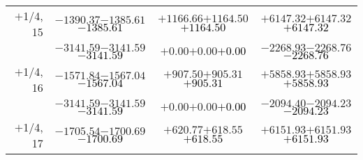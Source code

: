 \documentclass[compress]{beamer}
\begin{document}
\begin{frame}
{\begin{tabular}{r | c | c | c}
$+$1/4, 15 & $-1390.37$\hspace{0.1 cm}$-1385.61$\hspace{0.1 cm}\textcolor{black}{$-1385.61$} & $+1166.66$\hspace{0.1 cm}$+1164.50$\hspace{0.1 cm}\textcolor{black}{$+1164.50$} & $+6147.32$\hspace{0.1 cm}$+6147.32$\hspace{0.1 cm}\textcolor{black}{$+6147.32$} \\
           & $-3141.59$\hspace{0.1 cm}$-3141.59$\hspace{0.1 cm}\textcolor{black}{$-3141.59$} & $+0.00$\hspace{0.1 cm}$+0.00$\hspace{0.1 cm}\textcolor{black}{$+0.00$} & $-2268.93$\hspace{0.1 cm}$-2268.76$\hspace{0.1 cm}\textcolor{black}{$-2268.76$} \\
$+$1/4, 16 & $-1571.84$\hspace{0.1 cm}$-1567.04$\hspace{0.1 cm}\textcolor{black}{$-1567.04$} & $+907.50$\hspace{0.1 cm}$+905.31$\hspace{0.1 cm}\textcolor{black}{$+905.31$} & $+5858.93$\hspace{0.1 cm}$+5858.93$\hspace{0.1 cm}\textcolor{black}{$+5858.93$} \\
           & $-3141.59$\hspace{0.1 cm}$-3141.59$\hspace{0.1 cm}\textcolor{black}{$-3141.59$} & $+0.00$\hspace{0.1 cm}$+0.00$\hspace{0.1 cm}\textcolor{black}{$+0.00$} & $-2094.40$\hspace{0.1 cm}$-2094.23$\hspace{0.1 cm}\textcolor{black}{$-2094.23$} \\
$+$1/4, 17 & $-1705.54$\hspace{0.1 cm}$-1700.69$\hspace{0.1 cm}\textcolor{black}{$-1700.69$} & $+620.77$\hspace{0.1 cm}$+618.55$\hspace{0.1 cm}\textcolor{black}{$+618.55$} & $+6151.93$\hspace{0.1 cm}$+6151.93$\hspace{0.1 cm}\textcolor{black}{$+6151.93$} \\

\end{tabular}}
\end{frame}
\end{document}
